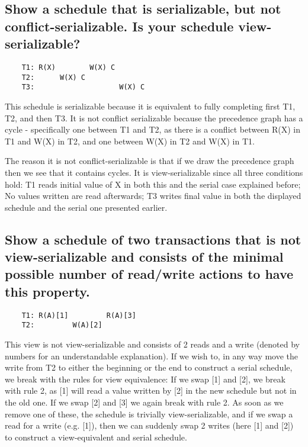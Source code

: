\documentclass{article}
\begin{document}
\subsection{Show a schedule that is serializable, but not conflict-serializable. Is your schedule view-serializable?}
\begin{verbatim}
    T1: R(X)        W(X) C
    T2:      W(X) C
    T3:                    W(X) C
\end{verbatim}
This schedule is serializable because it is equivalent to fully completing first T1, T2, and then T3. It is not conflict serializable because the precedence graph has a cycle - specifically one between T1 and T2, as there is a conflict between R(X) in T1 and W(X) in T2, and one between W(X) in T2 and W(X) in T1. 

The reason it is not conflict-serializable is that if we draw the precedence graph then we see that it contains cycles. It is view-serializable since all three conditions hold: T1 reads initial value of X in both this and the serial case explained before; No values written are read afterwards; T3 writes final value in both the displayed schedule and the serial one presented earlier.

\subsection{Show a schedule of two transactions that is not view-serializable and consists of the minimal possible number of read/write actions to have this property.}
\begin{verbatim}
    T1: R(A)[1]         R(A)[3]
    T2:         W(A)[2]
\end{verbatim}


This view is not view-serializable and consists of 2 reads and a write (denoted by numbers for an understandable explanation). If we wish to, in any way move the write from T2 to either the beginning or the end to construct a serial schedule, we break with the rules for view equivalence: If we swap [1] and [2], we break with rule 2, as [1] will read a value written by [2] in the new schedule but not in the old one. If we swap [2] and [3] we again break with rule 2. As soon as we remove one of these, the schedule is trivially view-serializable, and if we swap a read for a write (e.g. [1]), then we can suddenly swap 2 writes (here [1] and [2]) to construct a view-equivalent and serial schedule.
\end{document}
